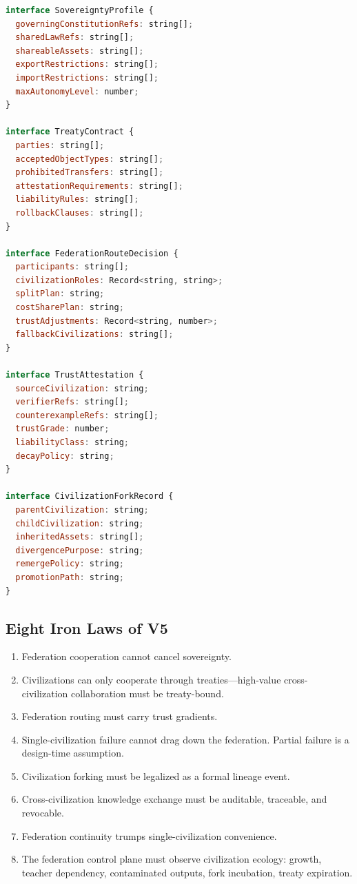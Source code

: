 \documentclass[12pt,a4paper]{article}
\begin{document}
\begin{lstlisting}[language=JavaScript]
interface SovereigntyProfile {
  governingConstitutionRefs: string[];
  sharedLawRefs: string[];
  shareableAssets: string[];
  exportRestrictions: string[];
  importRestrictions: string[];
  maxAutonomyLevel: number;
}

interface TreatyContract {
  parties: string[];
  acceptedObjectTypes: string[];
  prohibitedTransfers: string[];
  attestationRequirements: string[];
  liabilityRules: string[];
  rollbackClauses: string[];
}

interface FederationRouteDecision {
  participants: string[];
  civilizationRoles: Record<string, string>;
  splitPlan: string;
  costSharePlan: string;
  trustAdjustments: Record<string, number>;
  fallbackCivilizations: string[];
}

interface TrustAttestation {
  sourceCivilization: string;
  verifierRefs: string[];
  counterexampleRefs: string[];
  trustGrade: number;
  liabilityClass: string;
  decayPolicy: string;
}

interface CivilizationForkRecord {
  parentCivilization: string;
  childCivilization: string;
  inheritedAssets: string[];
  divergencePurpose: string;
  remergePolicy: string;
  promotionPath: string;
}
\end{lstlisting}


\subsection{Eight Iron Laws of V5}


\begin{enumerate}
  \item Federation cooperation cannot cancel sovereignty.
  \item Civilizations can only cooperate through treaties---high-value cross-civilization collaboration must be treaty-bound.
  \item Federation routing must carry trust gradients.
  \item Single-civilization failure cannot drag down the federation. Partial failure is a design-time assumption.
  \item Civilization forking must be legalized as a formal lineage event.
  \item Cross-civilization knowledge exchange must be auditable, traceable, and revocable.
  \item Federation continuity trumps single-civilization convenience.
  \item The federation control plane must observe civilization ecology: growth, teacher dependency, contaminated outputs, fork incubation, treaty expiration.
\end{enumerate}
\end{document}
